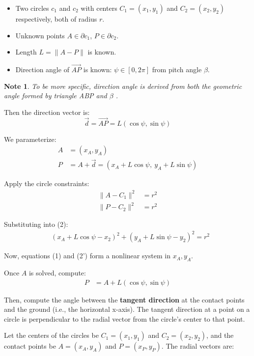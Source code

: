 \documentclass[11pt]{article}
\newtheorem{note}[statement]{Note}
\begin{document}
\begin{itemize}
    \item Two circles $c_1$ and $c_2$ with centers $C_1 = (x_1, y_1)$ and $C_2 = (x_2, y_2)$ respectively, both of radius $r$.
    \item Unknown points $A \in \partial c_1$, $P \in \partial c_2$.
    \item Length $L = \|A - P\|$ is known.
    \item Direction angle of $\vec{AP}$ is known: $\psi \in [0, 2\pi]$ from pitch angle \(\beta\).
\end{itemize}

\begin{note}
    To be more specific, direction angle is derived from both the geometric angle formed by triangle
    ABP and \(\beta\) .
\end{note}

Then the direction vector is:
\[
\vec{d} = \vec{AP} = L(\cos \psi, \sin \psi)
\]

We parameterize:
\begin{align*}
A &= (x_A, y_A) \\
P &= A + \vec{d} = (x_A + L \cos \psi,\ y_A + L \sin \psi)
\end{align*}

Apply the circle constraints:
\begin{align*}
\|A - C_1\|^2 &= r^2 \tag{1} \\
\|P - C_2\|^2 &= r^2 \tag{2}
\end{align*}

Substituting into (2):
\begin{align*}
&\left( x_A + L \cos \psi - x_2 \right)^2 + \left( y_A + L \sin \psi - y_2 \right)^2 = r^2 \tag{2'}
\end{align*}

Now, equations (1) and (2') form a nonlinear system in $x_A, y_A$.

Once $A$ is solved, compute:
\begin{align*}
P &= A + L(\cos \psi, \sin \psi)
\end{align*}

Then, compute the angle between the \textbf{tangent direction} at the contact points and the ground (i.e., the horizontal x-axis). The tangent direction at a point on a circle is perpendicular to the radial vector from the circle's center to that point.

Let the centers of the circles be $C_1 = (x_1, y_1)$ and $C_2 = (x_2, y_2)$, and the contact points be $A = (x_A, y_A)$ and $P = (x_P, y_P)$. The radial vectors are:
\end{document}
